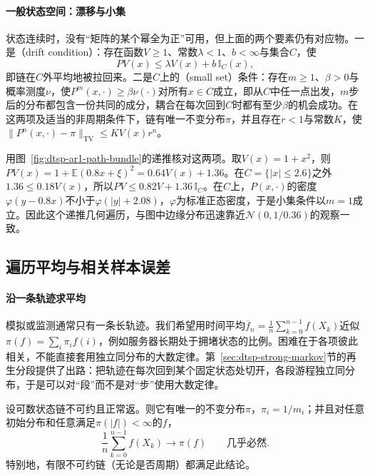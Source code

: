 \paragraph{一般状态空间：漂移与小集}
状态连续时，没有“矩阵的某个幂全为正”可用，但上面的两个要素仍有对应物。一是（drift condition）：存在函数$V\geq1$、常数$\lambda<1$、$b<\infty$与集合$C$，使
\[
  PV(x)\leq\lambda V(x)+b\,\mathbb I_C(x),
\]
即链在$C$外平均地被拉回来。二是$C$上的（small set）条件：存在$m\geq1$、$\beta>0$与概率测度$\nu$，使$P^m(x,\cdot)\geq\beta\nu(\cdot)$对所有$x\in C$成立，即从$C$中任一点出发，$m$步后的分布都包含一份共同的成分，耦合在每次回到$C$时都有至少$\beta$的机会成功。在这两项及适当的非周期条件下，链有唯一不变分布$\pi$，并且存在$r<1$与常数$K$，使$\lVert P^n(x,\cdot)-\pi\rVert_{\mathrm{TV}}\leq KV(x)r^n$。

用图~\ref{fig:dtsp-ar1-path-bundle}的递推核对这两项。取$V(x)=1+x^2$，则$PV(x)=1+\mathbb E(0.8x+\xi)^2=0.64V(x)+1.36$。在$C=\{|x|\leq2.6\}$之外$1.36\leq0.18V(x)$，所以$PV\leq0.82V+1.36\,\mathbb I_C$。在$C$上，$P(x,\cdot)$的密度$\varphi(y-0.8x)$不小于$\varphi(|y|+2.08)$，$\varphi$为标准正态密度，于是小集条件以$m=1$成立。因此这个递推几何遍历，与图中边缘分布迅速靠近$\mathcal N(0,1/0.36)$的观察一致。

\subsection{遍历平均与相关样本误差}
\label{sec:dtsp-ergodic-averages}
\label{sec:stoch-markov-long-run-average}

\paragraph{沿一条轨迹求平均}
模拟或监测通常只有一条长轨迹。我们希望用时间平均$\overline f_n=\frac1n\sum_{k=0}^{n-1}f(X_k)$近似$\pi(f)=\sum_i\pi_if(i)$，例如服务器长期处于拥堵状态的比例。困难在于各项彼此相关，不能直接套用独立同分布的大数定律。第~\ref{sec:dtsp-strong-markov}节的再生分段提供了出路：把轨迹在每次回到某个固定状态处切开，各段游程独立同分布，于是可以对“段”而不是对“步”使用大数定律。

\begin{theorem}[Markov链的遍历定理]
  \label{thm:dtsp-ergodic-theorem}
  设可数状态链不可约且正常返。则它有唯一的不变分布$\pi$，$\pi_i=1/m_i$；并且对任意初始分布和任意满足$\pi(|f|)<\infty$的$f$，
  \begin{equation}
    \frac1n\sum_{k=0}^{n-1}f(X_k)\longrightarrow\pi(f)\qquad\text{几乎必然}.
    \label{eq:dtsp-ergodic-average}
  \end{equation}
  特别地，有限不可约链（无论是否周期）都满足此结论。
\end{theorem}

